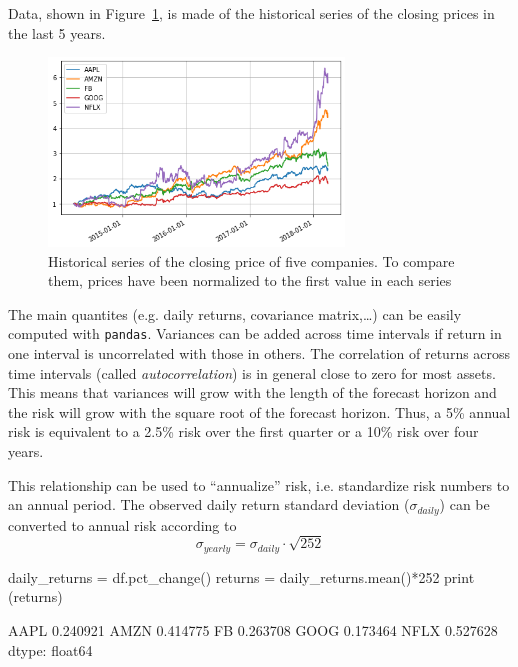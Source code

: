 Data, shown in Figure~\ref{fig:stocks}, is made of the historical series of the closing prices in the last 5 years. 

\begin{figure}[htbp]
\centering
\includegraphics[width=0.7\textwidth]{figures/portfolio_sample}
\caption{Historical series of the closing price of five companies. To compare them, prices have been normalized to the first value in each series}
\label{fig:stocks}
\end{figure}

The main quantites (e.g. daily returns, covariance matrix,\ldots) can be easily computed with \texttt{pandas}.
Variances can be added across time intervals if return in one interval is uncorrelated with those in others. The correlation of returns across time intervals (called \emph{autocorrelation}) is in general close to zero for most assets. This means that variances will grow with the length of the forecast horizon and the risk will grow with the square root of the forecast horizon. 
Thus, a 5\% annual risk is equivalent to a 2.5\% risk over the first quarter or a 10\% risk over four years. 

This relationship can be used to “annualize” risk, i.e. standardize risk numbers to an annual period. The observed daily return standard deviation ($\sigma_{daily}$) can be converted to annual risk according to
\begin{equation}
\sigma_{yearly} = \sigma_{daily}\cdot\sqrt{252}
\end{equation}

\begin{ipython}
daily_returns = df.pct_change()
returns = daily_returns.mean()*252
print (returns)
\end{ipython}
\begin{ioutput}
AAPL    0.240921
AMZN    0.414775
FB      0.263708
GOOG    0.173464
NFLX    0.527628
dtype: float64
\end{ioutput}

